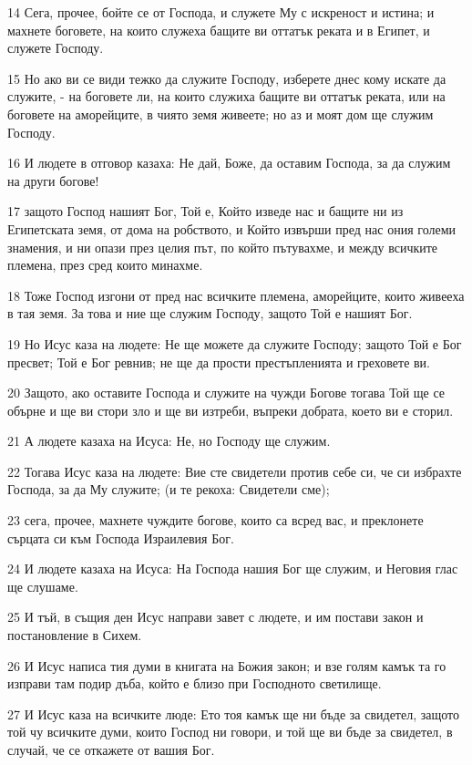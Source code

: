 \par 14 Сега, прочее, бойте се от Господа, и служете Му с искреност и истина; и махнете боговете, на които служеха бащите ви оттатък реката и в Египет, и служете Господу.
\par 15 Но ако ви се види тежко да служите Господу, изберете днес кому искате да служите, - на боговете ли, на които служиха бащите ви оттатък реката, или на боговете на аморейците, в чиято земя живеете; но аз и моят дом ще служим Господу.
\par 16 И людете в отговор казаха: Не дай, Боже, да оставим Господа, за да служим на други богове!
\par 17 защото Господ нашият Бог, Той е, Който изведе нас и бащите ни из Египетската земя, от дома на робството, и Който извърши пред нас ония големи знамения, и ни опази през целия път, по който пътувахме, и между всичките племена, през сред които минахме.
\par 18 Тоже Господ изгони от пред нас всичките племена, аморейците, които живееха в тая земя. За това и ние ще служим Господу, защото Той е нашият Бог.
\par 19 Но Исус каза на людете: Не ще можете да служите Господу; защото Той е Бог пресвет; Той е Бог ревнив; не ще да прости престъпленията и греховете ви.
\par 20 Защото, ако оставите Господа и служите на чужди Богове тогава Той ще се обърне и ще ви стори зло и ще ви изтреби, въпреки добрата, което ви е сторил.
\par 21 А людете казаха на Исуса: Не, но Господу ще служим.
\par 22 Тогава Исус каза на людете: Вие сте свидетели против себе си, че си избрахте Господа, за да Му служите; (и те рекоха: Свидетели сме);
\par 23 сега, прочее, махнете чуждите богове, които са всред вас, и преклонете сърцата си към Господа Израилевия Бог.
\par 24 И людете казаха на Исуса: На Господа нашия Бог ще служим, и Неговия глас ще слушаме.
\par 25 И тъй, в същия ден Исус направи завет с людете, и им постави закон и постановление в Сихем.
\par 26 И Исус написа тия думи в книгата на Божия закон; и взе голям камък та го изправи там подир дъба, който е близо при Господното светилище.
\par 27 И Исус каза на всичките люде: Ето тоя камък ще ни бъде за свидетел, защото той чу всичките думи, които Господ ни говори, и той ще ви бъде за свидетел, в случай, че се откажете от вашия Бог.
